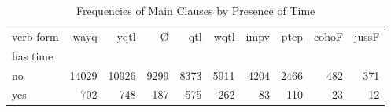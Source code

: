 \begin{table}[htbp!]
\centering
\caption{Frequencies of Main Clauses by Presence of Time}
\label{table:main_verb_ct}
\begin{tabular}{lrrrrrrrrr}
\toprule
verb form &   wayq &   yqtl &     Ø &   qtl &  wqtl &  impv &  ptcp &  cohoF &  jussF \\
has time &        &        &       &       &       &       &       &        &        \\
\midrule
no       &  14029 &  10926 &  9299 &  8373 &  5911 &  4204 &  2466 &    482 &    371 \\
yes      &    702 &    748 &   187 &   575 &   262 &    83 &   110 &     23 &     12 \\
\bottomrule
\end{tabular}
\end{table}
